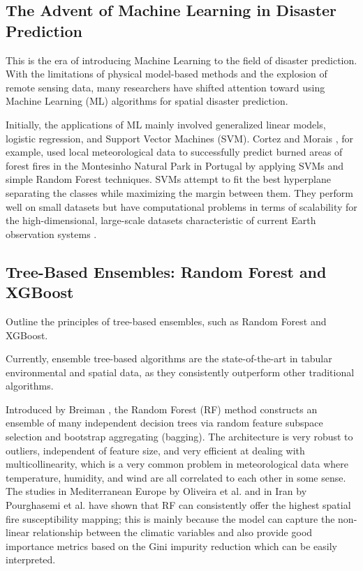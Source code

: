 \documentclass[journal, 10pt, twocolumn]{IEEEtran}
\begin{document}
\subsection{The Advent of Machine Learning in Disaster Prediction}
This is the era of introducing Machine Learning to the field of disaster prediction. With the limitations of physical model-based methods and the explosion of remote sensing data, many researchers have shifted attention toward using Machine Learning (ML) algorithms for spatial disaster prediction.

Initially, the applications of ML mainly involved generalized linear models, logistic regression, and Support Vector Machines (SVM). Cortez and Morais \cite{b24}, for example, used local meteorological data to successfully predict burned areas of forest fires in the Montesinho Natural Park in Portugal by applying SVMs and simple Random Forest techniques. SVMs attempt to fit the best hyperplane separating the classes while maximizing the margin between them. They perform well on small datasets but have computational problems in terms of scalability for the high-dimensional, large-scale datasets characteristic of current Earth observation systems \cite{b25}.


\subsection{Tree-Based Ensembles: Random Forest and XGBoost}
Outline the principles of tree-based ensembles, such as Random Forest and XGBoost.

Currently, ensemble tree-based algorithms are the state-of-the-art in tabular environmental and spatial data, as they consistently outperform other traditional algorithms.

Introduced by Breiman \cite{b26}, the Random Forest (RF) method constructs an ensemble of many independent decision trees via random feature subspace selection and bootstrap aggregating (bagging). The architecture is very robust to outliers, independent of feature size, and very efficient at dealing with multicollinearity, which is a very common problem in meteorological data where temperature, humidity, and wind are all correlated to each other in some sense. The studies in Mediterranean Europe by Oliveira et al. \cite{b27} and in Iran by Pourghasemi et al. \cite{b28} have shown that RF can consistently offer the highest spatial fire susceptibility mapping; this is mainly because the model can capture the non-linear relationship between the climatic variables and also provide good importance metrics based on the Gini impurity reduction which can be easily interpreted.
\end{document}
